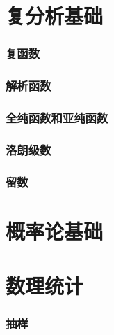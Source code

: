 \documentclass[UTF8]{ctexart}
\newcommand{\sectionbreak}{\clearpage}
\begin{document}
\part{复分析基础}

\section{复函数}

\section{解析函数}

\section{全纯函数和亚纯函数}

\section{洛朗级数}

\section{留数}
\sectionbreak


\part{概率论基础}

\sectionbreak


\sectionbreak


\sectionbreak


\sectionbreak


\sectionbreak


\sectionbreak


\sectionbreak


\sectionbreak


\sectionbreak

\part{数理统计}
\section{抽样}
\sectionbreak
\end{document}
